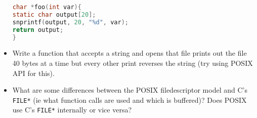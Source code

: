 \begin{itemize}
\begin{lstlisting}[language=C]
char *foo(int var){
static char output[20];
snprintf(output, 20, "%d", var);
return output;
}
\end{lstlisting}
\item
  Write a function that accepts a string and opens that file prints out
  the file 40 bytes at a time but every other print reverses the string
  (try using POSIX API for this).
\item
  What are some differences between the POSIX filedescriptor model and
  C's \texttt{FILE*} (ie what function calls are used and which is
  buffered)? Does POSIX use C's \texttt{FILE*} internally or vice versa?
\end{itemize}



